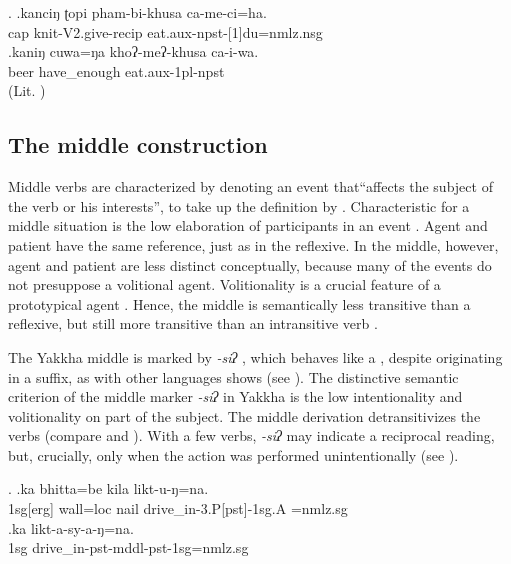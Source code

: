 	\ex. \ag.kanciŋ ʈopi pham-bi-khusa ca-me-ci=ha.\\
	  cap knit{\sc -V2.give-recip} eat{\sc .aux-npst-[1]du=nmlz.nsg}\\
	 \bg.kaniŋ cuwa=ŋa khoʔ-meʔ-khusa ca-i-wa.\\
	 beer have\_enough eat{\sc .aux-1pl-npst}\\
	 (Lit. )



\subsection{The middle construction}\label{middle}


Middle verbs are characterized by denoting an event that“affects the subject of the verb or his interests”, to take up the definition by \citet[373]{Lyons1969_Introduction}. Characteristic for a middle situation is the low elaboration of participants in an event \citep[3]{Kemmer1993_Middle}. Agent and patient have the same reference, just as in the reflexive. In the middle, however, agent and patient are less distinct conceptually, because many of the events do not presuppose a volitional agent. Volitionality is a crucial feature of a prototypical agent \citep{Hopperetal1980Transitivity, Foleyetal1984Functional}. Hence, the middle is semantically less transitive than a reflexive, but still more transitive than an intransitive verb  \citep[73]{Kemmer1993_Middle}. 

The Yakkha middle is marked by \emph{-siʔ} , which behaves like a , despite originating in a suffix, as  with other  languages shows (see ). The distinctive semantic criterion of the middle marker \emph{-siʔ} in Yakkha is the low intentionality and volitionality  on part of  the subject. The middle derivation detransitivizes the verbs (compare \Next[a] and \Next[b]). With a few verbs, \emph{-siʔ} may indicate a reciprocal reading, but, crucially, only when the action was performed unintentionally (see \NNext).

\ex. \ag.ka bhitta=be kila likt-u-ŋ=na.\\
		{\sc 1sg[erg]} wall{\sc =loc} nail 	drive\_in-{\sc 3.P[pst]-1sg.A =nmlz.sg}	\\
 	\bg.ka  likt-a-sy-a-ŋ=na.\\
		{\sc 1sg}  drive\_in{\sc -pst-mddl-pst-1sg=nmlz.sg} 		\\


